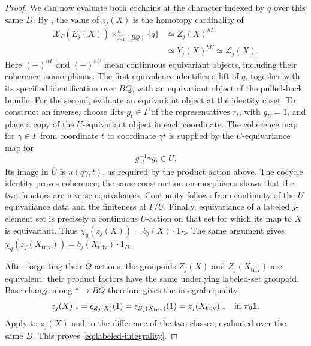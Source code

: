 \begin{proof}
We can now evaluate both cochains at the character indexed by $q$ over
this same $D$.  By , the value of $z_j(X)$ is
the homotopy cardinality of
\begin{equation}\label{eq:coinduced-fiber}
 \begin{aligned}
 \mathcal X_\Gamma(E_j(X))
       \mathop{\times}^{h}_{\mathcal X_\Gamma(BQ)}\{q\}
 &\simeq Z_j(X)^{h\Gamma}\\
 &\simeq Y_j(X)^{hU}
 \simeq\mathcal L_j(X).
 \end{aligned}
\end{equation}
Here $(-)^{h\Gamma}$ and $(-)^{hU}$ mean continuous equivariant objects,
including their coherence isomorphisms.  The first equivalence identifies
a lift of $q$, together with its specified identification over $BQ$, with
an equivariant object of the pulled-back bundle.
For the second, evaluate an equivariant object at the identity coset.
To construct an inverse, choose lifts $g_t\in\Gamma$ of the representatives
$r_t$, with $g_U=1$, and place a copy of the $U$-equivariant object in each
coordinate.
The coherence map for $\gamma\in\Gamma$ from coordinate $t$ to coordinate
$\gamma t$ is supplied by the $U$-equivariance map for
\[
 g_{\gamma t}^{-1}\gamma g_t\in U.
\]
Its image in $\overline U$ is $u(q\gamma,t)$, as required by the product
action above.
The cocycle identity proves coherence; the same construction on morphisms
shows that the two functors are inverse equivalences.
Continuity follows from continuity of the $U$-equivariance data and the
finiteness of $\Gamma/U$.
Finally, equivariance of a labeled $j$-element set is precisely a continuous
$U$-action on that set for which its map to $X$ is equivariant.
Thus $\chi_q(z_j(X))=b_j(X)\cdot1_D$.
The same argument gives
$\chi_q(z_j(X_{\mathrm{triv}}))=b_j(X_{\mathrm{triv}})\cdot1_D$.

After forgetting their $Q$-actions, the groupoids $Z_j(X)$ and
$Z_j(X_{\mathrm{triv}})$ are equivalent: their product factors have the same
underlying labeled-set groupoid.  Base change along $*\to BQ$ therefore
gives the integral equality
\[
 z_j(X)|_* =\epsilon_{Z_j(X)}(1)
           =\epsilon_{Z_j(X_{\mathrm{triv}})}(1)
           =z_j(X_{\mathrm{triv}})|_*
       \quad\text{in }\pi_0\mathbf1.
\]
Apply  to $z_j(X)$ and to the difference of the
two classes, evaluated over the same $D$.  This proves
\eqref{eq:labeled-integrality}.


\end{proof}

